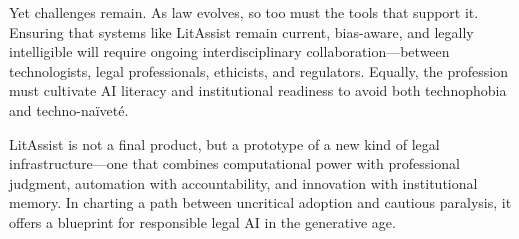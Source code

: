 \documentclass[12pt,a4paper]{article}
\begin{document}
Yet challenges remain. As law evolves, so too must the tools that support it. Ensuring that systems like LitAssist remain current, bias-aware, and legally intelligible will require ongoing interdisciplinary collaboration—between technologists, legal professionals, ethicists, and regulators. Equally, the profession must cultivate AI literacy and institutional readiness to avoid both technophobia and techno-naïveté.

LitAssist is not a final product, but a prototype of a new kind of legal infrastructure—one that combines computational power with professional judgment, automation with accountability, and innovation with institutional memory. In charting a path between uncritical adoption and cautious paralysis, it offers a blueprint for responsible legal AI in the generative age.
\end{document}
